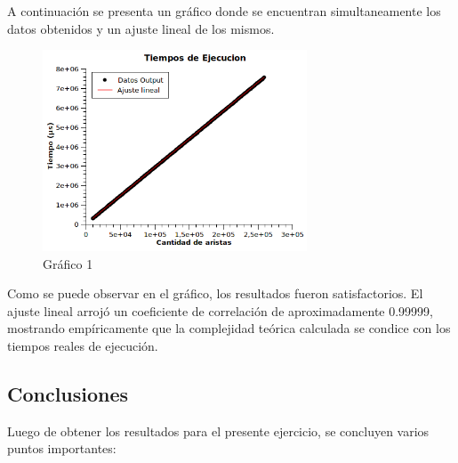 \documentclass[a4paper, 12pt]{article}
\begin{document}
A continuación se presenta un gráfico donde se encuentran simultaneamente los datos obtenidos y un ajuste lineal de los mismos.


\begin{figure}[H]
\centering
\includegraphics[width=0.7\textwidth]{imagenes/Resultados1.png} 
\caption{Gráfico 1}
\end{figure}

Como se puede observar en el gráfico, los resultados fueron satisfactorios. El ajuste lineal arrojó un coeficiente de correlación de aproximadamente 0.99999, mostrando empíricamente que la complejidad teórica calculada se condice con los tiempos reales de ejecución. 

\subsection*{Conclusiones}

Luego de obtener los resultados para el presente ejercicio, se concluyen varios puntos importantes:
\end{document}
